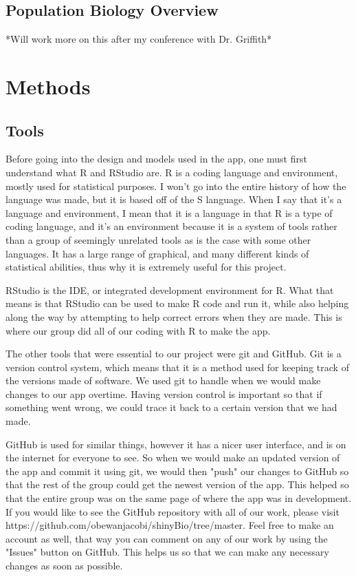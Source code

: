 \documentclass{article}\usepackage[]{graphicx}\usepackage[]{color}
\begin{document}
\subsection{Population Biology Overview}

*Will work more on this after my conference with Dr. Griffith*

\section{Methods}

\subsection{Tools}

Before going into the design and models used in the app, one must first understand what R and RStudio are. R is a coding language and environment, mostly used for statistical purposes. I won't go into the entire history of how the language was made, but it is based off of the S language. When I say that it's a language and environment, I mean that it is a language in that R is a type of coding language, and it's an environment because it is a system of tools rather than a group of seemingly unrelated tools as is the case with some other languages. It has a large range of graphical, and many different kinds of statistical abilities, thus why it is extremely useful for this project.

RStudio is the IDE, or integrated development environment for R. What that means is that RStudio can be used to make R code and run it, while also helping along the way by attempting to help correct errors when they are made. This is where our group did all of our coding with R to make the app. 

The other tools that were essential to our project were git and GitHub. Git is a version control system, which means that it is a method used for keeping track of the versions made of software. We used git to handle when we would make changes to our app overtime. Having version control is important so that if something went wrong, we could trace it back to a certain version that we had made. 

GitHub is used for similar things, however it has a nicer user interface, and is on the internet for everyone to see. So when we would make an updated version of the app and commit it using git, we would then "push" our changes to GitHub so that the rest of the group could get the newest version of the app. This helped so that the entire group was on the same page of where the app was in development. If you would like to see the GitHub repository with all of our work, please visit https://github.com/obewanjacobi/shinyBio/tree/master. Feel free to make an account as well, that way you can comment on any of our work by using the "Issues" button on GitHub. This helps us so that we can make any necessary changes as soon as possible.
\end{document}
